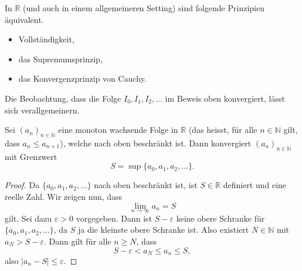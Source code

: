 \documentclass[../main.tex]{subfiles}
\begin{document}
\begin{remark}
  In $\mathbb{R}$ (und auch
  in einem allgemeineren Setting)
  sind folgende Prinzipien äquivalent.
  \begin{itemize}
    \item Vollständigkeit,
    \item das Supremumsprinzip,
    \item das Konvergenzprinzip von Cauchy.
  \end{itemize}
  
\end{remark}


Die Beobachtung, dass die Folge $I_0, I_1, I_2, \dots$
im Beweis oben konvergiert, lässt sich verallgemeinern.

\begin{monotony}
  Sei ${(a_n)}_{n \in \mathbb{N}}$ eine monoton wachsende
  Folge in $\mathbb{R}$ (das heisst, für alle
  $n \in \mathbb{N}$ gilt, dass $a_n \leq a_{n+1}$),
  welche nach oben beschränkt ist.
  Dann konvergiert ${(a_n)}_{n \in \mathbb{N}}$ mit
  Grenzwert
  \[
    S = \sup \{a_0, a_1, a_2, \dots\}.
  \]
\end{monotony}

\begin{proof}
  Da $\{a_0, a_1, a_2, \dots\}$ nach oben beschränkt ist,
  ist $S \in \mathbb{R}$ definiert und eine reelle Zahl.
  Wir zeigen nun, dass
  \[
    \lim_{n \to \infty} a_n = S
  \]
  gilt.
  Sei dazu $\varepsilon > 0$ vorgegeben. 
  Dann ist $S - \varepsilon$ keine obere Schranke
  für $\{a_0, a_1, a_2, \dots\}$,
  da $S$ ja die kleinste obere Schranke ist.
  Also existiert $N \in \mathbb{N}$ mit
  $a_N > S - \varepsilon$.
  Dann gilt für alle $n \geq N$, dass
  \[
    S - \varepsilon < a_N \leq a_n \leq S,
  \]
  also $|a_n - S| \leq \varepsilon$.
\end{proof}
\end{document}
